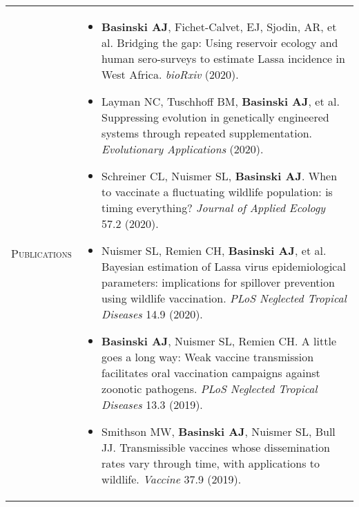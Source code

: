 \documentclass[11pt]{article}
\newcommand{\cellone}{3.5cm} %
\newcommand{\celltwo}{11cm}
\newcommand{\spa}{\vspace{.4in}}
\begin{document}
\spa
\spa

\begin{tabularx}{\textwidth}{p{\cellone} p{\celltwo}}
  \parbox[t][0cm]{\cellone}{P\textsc{ublications}} &  \parbox[t][0cm]{12cm}{ 

    \vspace{-0.65cm}
    \begin{itemize}

    \item {\bf Basinski AJ}, Fichet-Calvet, EJ, Sjodin, AR, et al. Bridging the gap: Using reservoir ecology and human sero-surveys to estimate Lassa incidence in West Africa. \emph{bioRxiv} (2020).

      \vspace{0.05in}      

    \item Layman NC, Tuschhoff BM, {\bf Basinski AJ}, et al. Suppressing evolution in genetically engineered systems through repeated supplementation. \emph{Evolutionary Applications} (2020).
      
      \vspace{0.05in}
      
    \item Schreiner CL, Nuismer SL, {\bf Basinski AJ}. When to vaccinate a fluctuating wildlife population: is timing everything? \emph{Journal of Applied Ecology} 57.2 (2020). 

      \vspace{0.05in}      
      
    \item Nuismer SL, Remien CH, {\bf Basinski AJ}, et al. Bayesian estimation of Lassa virus epidemiological parameters: implications for spillover prevention using wildlife vaccination. \emph{PLoS Neglected Tropical Diseases} 14.9 (2020).
      
      \vspace{0.05in}
      
    \item {\bf Basinski AJ}, Nuismer SL, Remien CH. A little goes a long way: Weak vaccine transmission facilitates oral vaccination campaigns against zoonotic pathogens. \emph{PLoS Neglected Tropical Diseases} 13.3 (2019).

      \vspace{0.05in}

      \item Smithson MW, {\bf Basinski AJ}, Nuismer SL, Bull JJ. Transmissible vaccines whose dissemination rates vary through time, with applications to wildlife. \emph{Vaccine} 37.9 (2019).
            
    \end{itemize}
  }
\end{tabularx}
\end{document}

